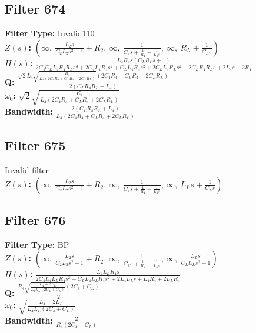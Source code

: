\documentclass{article}
\begin{document}
\subsection*{Filter 674}
\textbf{Filter Type:} Invalid110 \\ 
\textbf{$Z(s)$:} $\left( \infty, \  \frac{L_{2} s}{C_{2} L_{2} s^{2} + 1} + R_{2}, \  \infty, \  \frac{1}{C_{4} s + \frac{1}{R_{4}} + \frac{1}{L_{4} s}}, \  \infty, \  R_{L} + \frac{1}{C_{L} s}\right)$ \\ 
\textbf{$H(s)$:} $\frac{L_{4} R_{4} s \left(C_{L} R_{L} s + 1\right)}{2 C_{4} C_{L} L_{4} R_{4} R_{L} s^{3} + 2 C_{4} L_{4} R_{4} s^{2} + C_{L} L_{4} R_{4} s^{2} + 2 C_{L} L_{4} R_{L} s^{2} + 2 C_{L} R_{4} R_{L} s + 2 L_{4} s + 2 R_{4}}$ \\ 
\textbf{Q:} $\frac{\sqrt{2} L_{4} \sqrt{\frac{R_{4}}{L_{4} \left(2 C_{4} R_{4} + C_{L} R_{4} + 2 C_{L} R_{L}\right)}} \left(2 C_{4} R_{4} + C_{L} R_{4} + 2 C_{L} R_{L}\right)}{2 \left(C_{L} R_{4} R_{L} + L_{4}\right)}$ \\ 
\textbf{$\omega_0$:} $\sqrt{2} \sqrt{\frac{R_{4}}{L_{4} \left(2 C_{4} R_{4} + C_{L} R_{4} + 2 C_{L} R_{L}\right)}}$ \\ 
\textbf{Bandwidth:} $\frac{2 \left(C_{L} R_{4} R_{L} + L_{4}\right)}{L_{4} \left(2 C_{4} R_{4} + C_{L} R_{4} + 2 C_{L} R_{L}\right)}$ \\ 
\subsection*{Filter 675}
Invalid filter \\ 
\textbf{$Z(s)$:} $\left( \infty, \  \frac{L_{2} s}{C_{2} L_{2} s^{2} + 1} + R_{2}, \  \infty, \  \frac{1}{C_{4} s + \frac{1}{R_{4}} + \frac{1}{L_{4} s}}, \  \infty, \  L_{L} s + \frac{1}{C_{L} s}\right)$ \\ 
\subsection*{Filter 676}
\textbf{Filter Type:} BP \\ 
\textbf{$Z(s)$:} $\left( \infty, \  \frac{L_{2} s}{C_{2} L_{2} s^{2} + 1} + R_{2}, \  \infty, \  \frac{1}{C_{4} s + \frac{1}{R_{4}} + \frac{1}{L_{4} s}}, \  \infty, \  \frac{L_{L} s}{C_{L} L_{L} s^{2} + 1}\right)$ \\ 
\textbf{$H(s)$:} $\frac{L_{4} L_{L} R_{4} s}{2 C_{4} L_{4} L_{L} R_{4} s^{2} + C_{L} L_{4} L_{L} R_{4} s^{2} + 2 L_{4} L_{L} s + L_{4} R_{4} + 2 L_{L} R_{4}}$ \\ 
\textbf{Q:} $\frac{R_{4} \sqrt{\frac{L_{4} + 2 L_{L}}{L_{4} L_{L} \left(2 C_{4} + C_{L}\right)}} \left(2 C_{4} + C_{L}\right)}{2}$ \\ 
\textbf{$\omega_0$:} $\sqrt{\frac{L_{4} + 2 L_{L}}{L_{4} L_{L} \left(2 C_{4} + C_{L}\right)}}$ \\ 
\textbf{Bandwidth:} $\frac{2}{R_{4} \left(2 C_{4} + C_{L}\right)}$ \\ 
\end{document}
